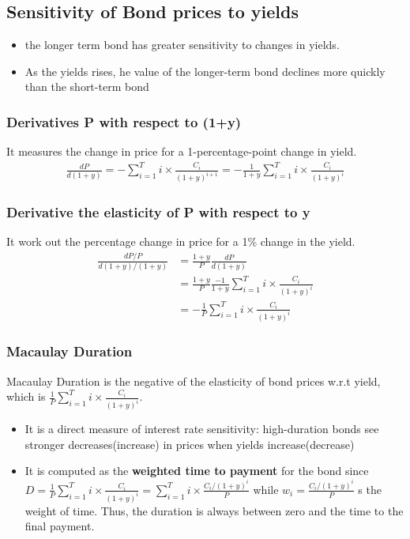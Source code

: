 \documentclass{article}
\theoremstyle{definition}
\theoremstyle{thrm}
\theoremstyle{lma}
\theoremstyle{ppst}
\theoremstyle{crlr}
\begin{document}
\subsection{Sensitivity of Bond prices to yields}
\begin{itemize}
	\item the longer term bond has greater sensitivity to changes in yields. 
	\item As the yields rises, he value of the longer-term bond declines more quickly than the short-term bond
\end{itemize}
\subsubsection{Derivatives P with respect to (1+y)}
It measures the change in price for a 1-percentage-point change in yield. 
\begin{align*}
	\frac{dP}{d(1+y)} = -\sum_{i=1}^T i \times \frac{C_i}{(1+y)^{i+1}} = -\frac{1}{1+y}\sum_{i=1}^T i\times \frac{C_i}{(1+y)^i}
\end{align*}
\subsubsection{Derivative the elasticity of P with respect to y}
It work out the percentage change in price for a 1\% change in the yield.
\begin{align*}
	\frac{dP/P}{d(1+y)/(1+y)} &= \frac{1+y}{P}\frac{dP}{d(1+y)}\\
	&= \frac{1+y}{P}\frac{-1}{1+y}\sum_{i=1}^T i\times \frac{C_i}{(1+y)^i}\\
	&= -\frac{1}{P}\sum_{i=1}^T i\times \frac{C_i}{(1+y)^i}
\end{align*}
\subsubsection{Macaulay Duration}
Macaulay Duration is the negative of the elasticity of bond prices w.r.t yield, which is $\frac{1}{P}\sum_{i=1}^T i\times \frac{C_i}{(1+y)^i}$.\\
\begin{itemize}
	\item It is a direct measure of interest rate sensitivity: high-duration bonds see stronger decreases(increase) in prices when yields increase(decrease)
	\item It is computed as the \textbf{weighted time to payment} for the bond since $D = \frac{1}{P}\sum_{i=1}^T i\times \frac{C_i}{(1+y)^i} = \sum_{i=1}^T i\times \frac{C_i/(1+y)^i}{P}$ while $w_i = \frac{C_i/(1+y)^i}{P}$ s the weight of time. Thus, the duration is always between zero and the time to the final payment. 
\end{itemize}
\end{document}
